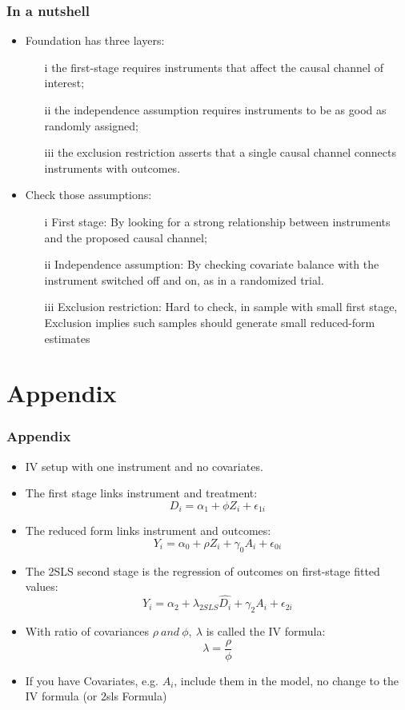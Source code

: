\documentclass{beamer}
\begin{document}
\begin{frame}
\frametitle{In a nutshell}

\begin{itemize}
	\item Foundation has three layers: 
	\begin{itemize}
		\item[i] the first-stage requires instruments that affect the causal channel of interest; 
		\item[ii] the independence assumption requires instruments to be as good as randomly assigned; 
		\item[iii] the exclusion restriction asserts that a single causal channel connects instruments with outcomes.
	\end{itemize}
	\item Check those assumptions:
\begin{itemize}
	\item[i] First stage: By looking for a strong relationship between instruments and the proposed causal channel;
	\item[ii] Independence assumption: By checking covariate balance with the instrument switched off and on, as in a randomized trial.
	\item[iii] Exclusion restriction: Hard to check, in sample with small first stage, Exclusion implies such samples should generate small reduced-form estimates
\end{itemize}


\end{itemize}
\end{frame}


\section{Appendix}
\begin{frame}
\frametitle{Appendix}

\begin{itemize}
	\item IV setup with one instrument and no covariates. 
	\item The first stage links instrument and treatment: 
	$$D_i=\alpha_1 + \phi Z_i + \epsilon_{1i}$$
	\item The reduced form links instrument and outcomes: 
	$$Y_i=\alpha_0 + \rho Z_i + \gamma_0 A_i + \epsilon_{0i}$$
	\item The 2SLS second stage is the regression of outcomes on first-stage fitted values:
	$$Y_i=\alpha_2+\lambda_{2SLS}\hat{D_i}+\gamma_2 A_i +\epsilon_{2i}$$
	\item With ratio of covariances $\rho~ and~ \phi, ~\lambda$ is called the IV formula:
	$$\lambda = \frac{\rho}{\phi}$$
	\item If you have Covariates, e.g. $A_i$, include them in the model, no change to the IV formula (or 2sls Formula)
\end{itemize}
\end{frame}
\end{document}
